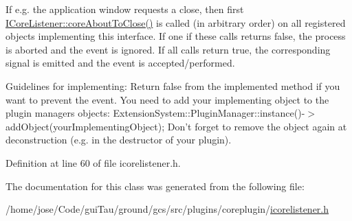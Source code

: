 If e.\-g. the application window requests a close, then first \hyperlink{group___core_plugin_ga234ba638cc5653d3bb183df5c9fe0ce2}{I\-Core\-Listener\-::core\-About\-To\-Close()} is called (in arbitrary order) on all registered objects implementing this interface. If one if these calls returns false, the process is aborted and the event is ignored. If all calls return true, the corresponding signal is emitted and the event is accepted/performed.

Guidelines for implementing\-:   Return false from the implemented method if you want to prevent the event.  You need to add your implementing object to the plugin managers objects\-: Extension\-System\-::\-Plugin\-Manager\-::instance()-\/$>$add\-Object(your\-Implementing\-Object);  Don't forget to remove the object again at deconstruction (e.\-g. in the destructor of your plugin). 

Definition at line 60 of file icorelistener.\-h.



The documentation for this class was generated from the following file\-:\begin{DoxyCompactItemize}
\item 
/home/jose/\-Code/gui\-Tau/ground/gcs/src/plugins/coreplugin/\hyperlink{icorelistener_8h}{icorelistener.\-h}\end{DoxyCompactItemize}
